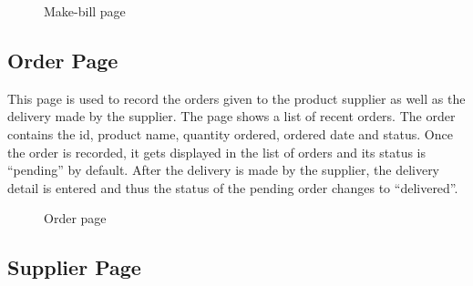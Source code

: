 \begin{figure}[h!]\centering
  \caption{Make-bill page}\label{fig:bill}
\end{figure}

\subsection{Order Page}

This page is used to record the orders given to the product supplier as well as
the delivery made by the supplier. The page shows a list of recent orders. The
order contains the id, product name, quantity ordered, ordered date and status.
Once the order is recorded, it gets displayed in the list of orders and its
status is ``pending'' by default. After the delivery is made by the supplier, the
delivery detail is entered and thus the status of the pending order changes to
``delivered''.

\begin{figure}[h!]\centering
  \caption{Order page}\label{fig:order}
\end{figure}

\subsection{Supplier Page}

